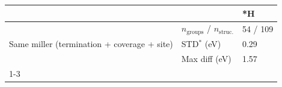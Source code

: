 \begin{tabular}{lll}
\toprule
 &  & *H \\
\midrule
\multirow[t]{3}{*}{Same miller (termination + coverage + site)} & $n_{\text{groups}}$ / $n_{\text{struc.}}$ & 54 / 109 \\
 & STD$^*$ (eV) & 0.29 \\
 & Max diff (eV) & 1.57 \\
\cline{1-3}
\bottomrule
\end{tabular}
